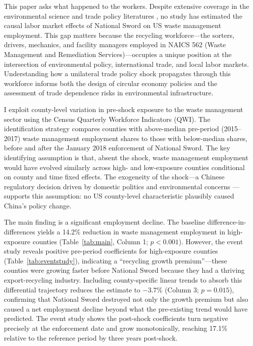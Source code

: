 \documentclass[12pt]{article}
\begin{document}
This paper asks what happened to the workers. Despite extensive coverage in the environmental science and trade policy literatures \citep{Kellenberg2012, Higashida2014, Yamaguchi2022}, no study has estimated the causal labor market effects of National Sword on US waste management employment. This gap matters because the recycling workforce---the sorters, drivers, mechanics, and facility managers employed in NAICS 562 (Waste Management and Remediation Services)---occupies a unique position at the intersection of environmental policy, international trade, and local labor markets. Understanding how a unilateral trade policy shock propagates through this workforce informs both the design of circular economy policies and the assessment of trade dependence risks in environmental infrastructure.

I exploit county-level variation in pre-shock exposure to the waste management sector using the Census Quarterly Workforce Indicators (QWI). The identification strategy compares counties with above-median pre-period (2015--2017) waste management employment shares to those with below-median shares, before and after the January 2018 enforcement of National Sword. The key identifying assumption is that, absent the shock, waste management employment would have evolved similarly across high- and low-exposure counties conditional on county and time fixed effects. The exogeneity of the shock---a Chinese regulatory decision driven by domestic politics and environmental concerns \citep{Huang2020}---supports this assumption: no US county-level characteristic plausibly caused China's policy change.

The main finding is a significant employment decline. The baseline difference-in-differences yields a 14.2\% reduction in waste management employment in high-exposure counties (Table~\ref{tab:main}, Column 1; $p < 0.001$). However, the event study reveals positive pre-period coefficients for high-exposure counties (Table~\ref{tab:eventstudy}), indicating a ``recycling growth premium''---these counties were growing faster before National Sword because they had a thriving export-recycling industry. Including county-specific linear trends to absorb this differential trajectory reduces the estimate to $-3.7\%$ (Column 3; $p = 0.015$), confirming that National Sword destroyed not only the growth premium but also caused a net employment decline beyond what the pre-existing trend would have predicted. The event study shows the post-shock coefficients turn negative precisely at the enforcement date and grow monotonically, reaching 17.1\% relative to the reference period by three years post-shock.
\end{document}
